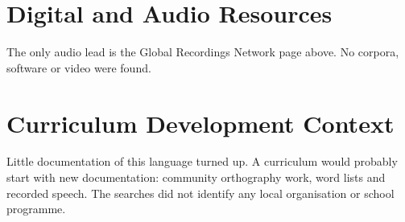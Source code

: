 \documentclass[12pt]{article}
\begin{document}
\section{Digital and Audio Resources}
The only audio lead is the Global Recordings Network page above. No corpora, software or video were found.

\section{Curriculum Development Context}
Little documentation of this language turned up. A curriculum would probably start with new documentation: community orthography work, word lists and recorded speech. The searches did not identify any local organisation or school programme.
\end{document}
